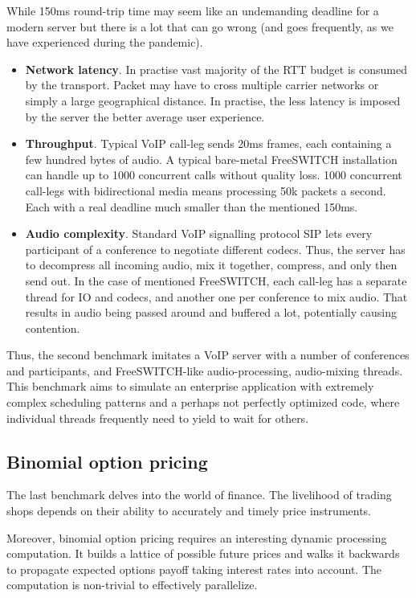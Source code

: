 \documentclass[12pt,a4paper,twoside]{report}
\begin{document}
While 150ms round-trip time may seem like an undemanding deadline for a modern server but there is a lot that can go wrong (and goes frequently, as we have experienced during the pandemic). 
\begin{itemize}
    \item \textbf{Network latency}. In practise vast majority of the RTT budget is consumed by the transport. Packet may have to cross multiple carrier networks or simply a large geographical distance. In practise, the less latency is imposed by the server the better average user experience. 
    \item \textbf{Throughput}. Typical VoIP call-leg sends 20ms frames, each containing a few hundred bytes of audio. A typical bare-metal FreeSWITCH \cite{Maruzzelli2017-ou} installation can handle up to 1000 concurrent calls without quality loss. 1000 concurrent call-legs with bidirectional media means processing 50k packets a second. Each with a real deadline much smaller than the mentioned 150ms. 
    \item \textbf{Audio complexity}. Standard VoIP signalling protocol SIP lets every participant of a conference to negotiate different codecs. Thus, the server has to decompress all incoming audio, mix it together, compress, and only then send out. In the case of mentioned FreeSWITCH, each call-leg has a separate thread for IO and codecs, and another one per conference to mix audio. That results in audio being passed around and buffered a lot, potentially causing contention.   
\end{itemize}

Thus, the second benchmark imitates a VoIP server with a number of conferences and participants, and FreeSWITCH-like \cite{Maruzzelli2017-ou} audio-processing, audio-mixing threads. This benchmark aims to simulate an enterprise application with extremely complex scheduling patterns and a perhaps not perfectly optimized code, where individual threads frequently need to yield to wait for others.

\subsection{Binomial option pricing}
\label{section:bench-option-pricing}
The last benchmark delves into the world of finance. The livelihood of trading shops depends on their ability to accurately and timely price instruments. 


Moreover, binomial option pricing requires an interesting dynamic processing computation. It builds a lattice of possible future prices and walks it backwards to propagate expected options payoff taking interest rates into account. The computation is non-trivial to effectively parallelize. 
\end{document}
